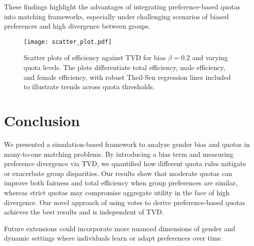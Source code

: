 \documentclass[letterpaper]{article}
\begin{document}
These findings highlight the advantages of integrating preference-based quotas into matching frameworks, especially under challenging scenarios of biased preferences and high divergence between groups.

\begin{figure}[ht]

  \centering
  \texttt{[image: scatter\_plot.pdf]}
\caption{Scatter plots of efficiency against TVD for bias \( \beta = 0.2 \) and varying quota levels. The plots differentiate total efficiency, male efficiency, and female efficiency, with robust Theil-Sen regression lines included to illustrate trends across quota thresholds.}

  \label{fig:scatter_plot}
\end{figure}

\section{Conclusion}
We presented a simulation-based framework to analyze gender bias and quotas in many-to-one matching problems. By introducing a bias term and measuring preference divergence via TVD, we quantified how different quota rules mitigate or exacerbate group disparities. Our results show that moderate quotas can improve both fairness and total efficiency when group preferences are similar, whereas strict quotas may compromise aggregate utility in the face of high divergence. Our novel approach of using votes to derive preference-based quotas achieves the best results and is independent of TVD. 

Future extensions could incorporate more nuanced dimensions of gender and dynamic settings where individuals learn or adapt preferences over time.




\end{document}
